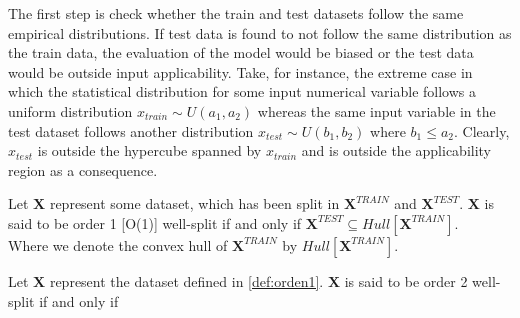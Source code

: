 \begin{table}[htbp]
	\centering
\end{table}




\indent The first step is check whether the train and test datasets follow the same empirical distributions. If test data is found to not follow the same distribution as the train data, the evaluation of the model would be biased or the test data would be outside input applicability. Take, for instance, the extreme case in which the statistical distribution for some input numerical variable follows a uniform distribution $x_{train} \sim U(a_1,a_2)$ whereas the same input variable in the test dataset follows another distribution $x_{test} \sim U(b_1,b_2)$ where $b_1 \leq a_2$. Clearly, $x_{test}$ is outside the hypercube spanned by $x_{train}$ and is outside the applicability region as a consequence.

\begin{definition}\label{def:orden1}
	Let $\mathbf{X}$ represent some dataset, which has been split in $\mathbf{X}^{TRAIN}$ and $\mathbf{X}^{TEST}$. $\mathbf{X}$ is said to be order 1 [O(1)] well-split if and only if $\mathbf{X}^{TEST} \subseteq Hull[\mathbf{X}^{TRAIN}]$.\\
	
	Where we denote the convex hull of $\mathbf{X}^{TRAIN}$ by $Hull[\mathbf{X}^{TRAIN}]$.
\end{definition}

\begin{definition}
	Let $\mathbf{X}$ represent the dataset defined in \autoref{def:orden1}. $\mathbf{X}$ is said to be order 2 well-split if and only if 
\end{definition}
%



\clearpage
